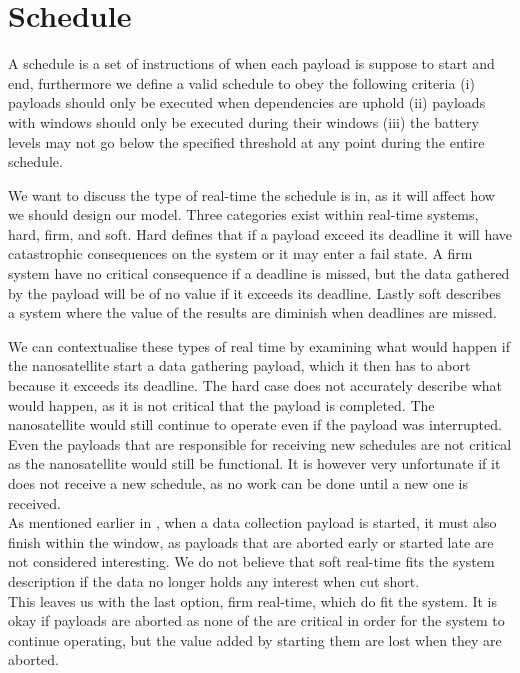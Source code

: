 \section{Schedule} \label{sec:schedule}
A schedule is a set of instructions of when each payload is suppose to start and end, furthermore we define a valid schedule to obey the following criteria (i) payloads should only be executed when dependencies are uphold (ii) payloads with windows should only be executed during their windows (iii) the battery levels may not go below the specified threshold at any point during the entire schedule.

We want to discuss the type of real-time the schedule is in, as it will affect how we should design our model.
Three categories exist within real-time systems, hard, firm, and soft. Hard defines that if a payload exceed its deadline it will have catastrophic consequences on the system or it may enter a fail state. A firm system have no critical consequence if a deadline is missed, but the data gathered by the payload will be of no value if it exceeds its deadline. Lastly soft describes a system where the value of the results are diminish when deadlines are missed\cite{real_time_computing}.

We can contextualise these types of real time by examining what would happen if the nanosatellite start a data gathering payload, which it then has to abort because it exceeds its deadline.
The hard case does not accurately describe what would happen, as it is not critical that the payload is completed. The nanosatellite would still continue to operate even if the payload was interrupted. Even the payloads that are responsible for receiving new schedules are not critical as the nanosatellite would still be functional. It is however very unfortunate if it does not receive a new schedule, as no work can be done until a new one is received.\\
As mentioned earlier in , when a data collection payload is started, it must also finish within the window, as payloads that are aborted early or started late are not considered interesting. We do not believe that soft real-time fits the system description if the data no longer holds any interest when cut short.\\
This leaves us with the last option, firm real-time, which do fit the system. It is okay if payloads are aborted as none of the are  critical in order for the system to continue operating, but the value added by starting them are lost when they are aborted.
